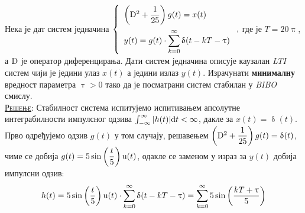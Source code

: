 \PID 
Нека је  
дат систем једначина
$
\displaystyle
\left\lbrace
\begin{array}{l}
\left({\rm D}^2 + \dfrac{1}{25} \right) g(t) = x(t) 
\\[4mm] \displaystyle
y(t) = g(t) \cdot \sum_{k=0}^{\infty} \updelta(t - kT - \uptau)
\end{array} 
\right.,$
где је $T = 20\uppi$, а ${\rm D}$ је оператор 
диференцирања. Дати систем једначина описује
каузалан \textit{LTI} систем чији је једини улаз 
$x(t)$ а једини излаз $y(t)$.
Израчунати \textbf{минималну} вредност параметра $\uptau > 0$ тако да је посматрани систем
стабилан у \textit{BIBO} смислу.
\\[2mm]

\textsc{\underline{Решење}}: Стабилност система испитујемо испитивањем апсолутне интеграбилности импулсног одзива
$\int_{-\infty}^{\infty} |h(t)| {\rm d} t < \infty$, дакле за $x(t) = \updelta(t)$. Прво одређујемо одзив $g(t)$ у том случају,
решавењем $\left({\rm D}^2 + \dfrac{1}{25} \right) g(t) = \updelta(t)$, чиме се добија 
$g(t) =  5 \sin\left(\dfrac{t}{5}\right) {\rm u}(t)$, одакле се заменом у израз за $y(t)$ добија импулсни одзив: 
\begin{equation}
    h(t) = 5 \sin\left(\dfrac{t}{5}\right) {\rm u}(t) \cdot \sum_{k=0}^{\infty} \updelta(t - kT - \uptau) 
         = \sum_{k=0}^{\infty}  5 \sin\left(\dfrac{kT + \uptau}{5}\right) 
\end{equation}

